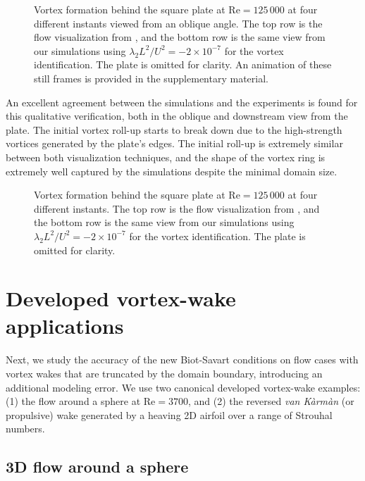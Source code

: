 \documentclass[11pt]{article}
\begin{document}
\begin{figure}
    \centering
    \def\svgwidth{1\columnwidth}
    
    \caption{Vortex formation behind the square plate at $\text{Re}=125\,000$ at four different instants viewed from an oblique angle. The top row is the flow visualization from \cite{Higuchi1996Three-dimensionalPlates}, and the bottom row is the same view from our simulations using $\lambda_2L^2/U^2=-2\times10^{-7}$ for the vortex identification. The plate is omitted for clarity. An animation of these still frames is provided in the supplementary material.}
    \label{fig:square_disk_comparison_oblique}
\end{figure}
An excellent agreement between the simulations and the experiments is found for this qualitative verification, both in the oblique and downstream view from the plate. The initial vortex roll-up starts to break down due to the high-strength vortices generated by the plate's edges. The initial roll-up is extremely similar between both visualization techniques, and the shape of the vortex ring is extremely well captured by the simulations despite the minimal domain size.
\begin{figure}
    \centering
    \def\svgwidth{1\columnwidth}
    
    \caption{Vortex formation behind the square plate at $\text{Re}=125\,000$ at four different instants. The top row is the flow visualization from \cite{Higuchi1996Three-dimensionalPlates}, and the bottom row is the same view from our simulations using $\lambda_2L^2/U^2=-2\times10^{-7}$ for the vortex identification. The plate is omitted for clarity.}
    \label{fig:square_disk_comparison}
\end{figure}

\section{Developed vortex-wake applications}

Next, we study the accuracy of the new Biot-Savart conditions on flow cases with vortex wakes that are truncated by the domain boundary, introducing an additional modeling error. We use two canonical developed vortex-wake examples: (1) the flow around a sphere at $\text{Re}=3700$, and (2) the reversed \emph{van K\`arm\`an} (or propulsive) wake generated by a heaving 2D airfoil over a range of Strouhal numbers.

\subsection{3D flow around a sphere}
\end{document}
